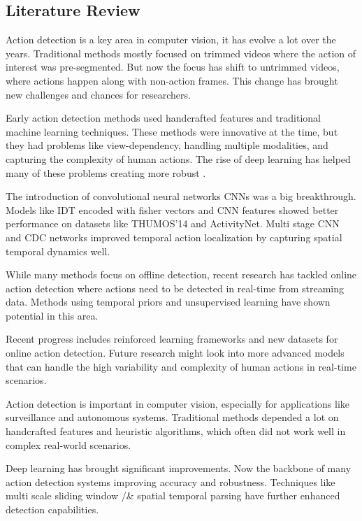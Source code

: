 \subsection{Literature Review} {

Action detection is a key area in computer vision, it has evolve a lot over the years. Traditional methods mostly focused on trimmed videos where the action of interest was pre-segmented. But now the focus has shift to untrimmed videos, where actions happen along with non-action frames. This change has brought new challenges and chances for researchers.


Early action detection methods used handcrafted features and traditional machine learning techniques. These methods were innovative at the time, but they had problems like view-dependency, handling multiple modalities, and capturing the complexity of human actions. The rise of deep learning has helped  many of these problems creating more robust .



The introduction of convolutional neural networks CNNs was a big breakthrough. Models like IDT encoded with fisher vectors and CNN features showed better performance on datasets like THUMOS'14 and ActivityNet. Multi stage CNN and CDC networks improved temporal action localization by capturing spatial temporal dynamics well.


While many methods focus on offline detection, recent research has tackled online action detection where actions need to be detected in real-time from streaming data. Methods using temporal priors and unsupervised learning have shown potential in this area.


Recent progress includes reinforced learning frameworks and new datasets for online action detection. Future research might look into more advanced models that can handle the high variability and complexity of human actions in real-time scenarios.



Action detection is important in computer vision, especially for applications like surveillance and autonomous systems. Traditional methods depended a lot on handcrafted features and heuristic algorithms, which often did not work well in complex real-world scenarios.


Deep learning has brought significant improvements. Now the backbone of many action detection systems improving accuracy and robustness. Techniques like multi scale sliding window /& spatial temporal parsing have further enhanced detection capabilities.


}
